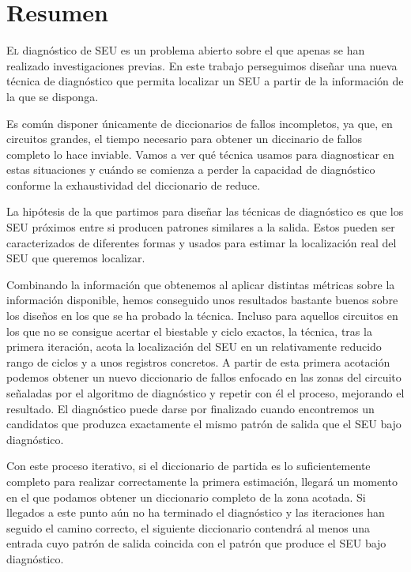 \chapter*{Resumen}
\pagestyle{especial}
{}

\lettrine[lraise=-0.1, lines=2, loversize=0.2]{E}{l} diagnóstico de \gls{SEU} es
un problema abierto sobre el que apenas se han realizado investigaciones previas.
En este trabajo perseguimos diseñar una nueva técnica de diagnóstico que permita
localizar un \gls{SEU} a partir de la información de la que se disponga.

Es común disponer únicamente de diccionarios de fallos incompletos, ya que, en
circuitos grandes, el tiempo necesario para obtener un diccinario de fallos
completo lo hace inviable. Vamos a ver qué técnica usamos para diagnosticar en
estas situaciones y cuándo se comienza a perder la capacidad de diagnóstico
conforme la exhaustividad del diccionario de reduce.

La hipótesis de la que partimos para diseñar las técnicas de diagnóstico es que
los \gls{SEU} próximos entre si producen patrones similares a la salida. Estos
pueden ser caracterizados de diferentes formas y usados para estimar la
localización real del \gls{SEU} que queremos localizar.

Combinando la información que obtenemos al aplicar distintas métricas sobre la
información disponible, hemos conseguido unos resultados bastante buenos sobre los
diseños en los que se ha probado la técnica. Incluso para aquellos circuitos en
los que no se consigue acertar el biestable y ciclo exactos, la técnica, tras la
primera iteración, acota la localización del \gls{SEU} en un relativamente 
reducido rango de ciclos y a unos registros concretos. A partir de esta primera
acotación podemos obtener un nuevo diccionario de fallos enfocado en las zonas del
circuito señaladas por el algoritmo de diagnóstico y repetir con él el proceso,
mejorando el resultado. El diagnóstico puede darse por finalizado cuando
encontremos un candidatos que produzca exactamente el mismo patrón de salida que
el \gls{SEU} bajo diagnóstico.

Con este proceso iterativo, si el diccionario de partida es lo suficientemente
completo para realizar correctamente la primera estimación, llegará un momento en
el que podamos obtener un diccionario completo de la zona acotada. Si llegados a
este punto aún no ha terminado el diagnóstico y las iteraciones han seguido el 
camino correcto, el siguiente diccionario contendrá al menos una entrada cuyo 
patrón de salida coincida con el patrón que produce el \gls{SEU} bajo diagnóstico.

